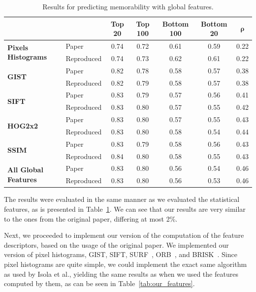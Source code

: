 \documentclass[10pt,twocolumn,letterpaper]{article}
\begin{document}
\begingroup
\setlength{\tabcolsep}{5pt}
\renewcommand{\arraystretch}{1.5}
\begin{table}[ht]
    \centering
    \begin{tabular}{|l||l|c|c|c|c|c|} \hline
         & & \textbf{Top 20} & \textbf{Top 100} & \textbf{Bottom 100} & \textbf{Bottom 20} & $\bm{\rho}$\\ \hline \hline
        \multirow{2}{*}{\textbf{Pixels Histograms}} & Paper & 0.74 & 0.72 & 0.61 & 0.59 & 0.22\\ \cline{2-7}
         & Reproduced & 0.74 & 0.73 & 0.62 & 0.61 & 0.22\\ \hline \hline
        \multirow{2}{*}{\textbf{GIST}} & Paper & 0.82 & 0.78 & 0.58 & 0.57 & 0.38\\ \cline{2-7}
         & Reproduced & 0.82 & 0.79 & 0.58 & 0.57 & 0.38\\ \hline \hline
        \multirow{2}{*}{\textbf{SIFT}} & Paper & 0.83 & 0.79 & 0.57 & 0.56 & 0.41\\ \cline{2-7}
         & Reproduced & 0.83 & 0.80 & 0.57 & 0.55 & 0.42\\ \hline \hline
        \multirow{2}{*}{\textbf{HOG2x2}} & Paper & 0.83 & 0.80 & 0.57 & 0.55 & 0.43\\ \cline{2-7}
         & Reproduced & 0.83 & 0.80 & 0.58 & 0.54 & 0.44\\ \hline \hline
        \multirow{2}{*}{\textbf{SSIM}} & Paper & 0.83 & 0.79 & 0.58 & 0.56 & 0.43\\ \cline{2-7}
         & Reproduced & 0.84 & 0.80 & 0.58 & 0.55 & 0.43\\ \hline \hline
        \multirow{2}{*}{\textbf{All Global Features}} & Paper & 0.83 & 0.80 & 0.56 & 0.54 & 0.46\\ \cline{2-7}
         & Reproduced & 0.83 & 0.80 & 0.56 & 0.53 & 0.46\\ \hline
    \end{tabular}
    \caption{Results for predicting memorability with global features.}
    \label{tab:global_features}
\end{table}
\endgroup

The results were evaluated in the same manner as we evaluated the statistical features, as is presented in Table~\ref{tab:global_features}. We can see that our results are very similar to the ones from the original paper, differing at most 2\%.

Next, we proceeded to implement our version of the computation of the feature descriptors, based on the usage of the original paper. We implemented our version of pixel histograms, GIST, SIFT, SURF~\cite{surf}, ORB~\cite{orb}, and BRISK~\cite{brisk}. Since pixel histograms are quite simple, we could implement the exact same algorithm as used by Isola et al., yielding the same results as when we used the features computed by them, as can be seen in Table~\ref{tab:our_features}.
\end{document}

